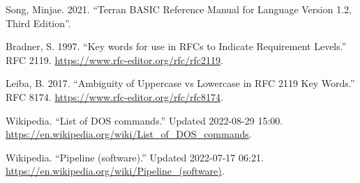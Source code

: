 \begin{itemlist}
\item Song, Minjae. 2021. ``Terran BASIC Reference Manual for Language Version 1.2, Third Edition''.
\item Bradner, S. 1997. ``Key words for use in RFCs to Indicate Requirement Levels.'' RFC 2119. \url{https://www.rfc-editor.org/rfc/rfc2119}.
\item Leiba, B. 2017. ``Ambiguity of Uppercase vs Lowercase in RFC 2119 Key Words.'' RFC 8174. \url{https://www.rfc-editor.org/rfc/rfc8174}.
\item Wikipedia. ``List of DOS commands.'' Updated 2022-08-29 15:00. \url{https://en.wikipedia.org/wiki/List_of_DOS_commands}.
\item Wikipedia. ``Pipeline (software).'' Updated 2022-07-17 06:21. \url{https://en.wikipedia.org/wiki/Pipeline_(software)}.
\end{itemlist}

